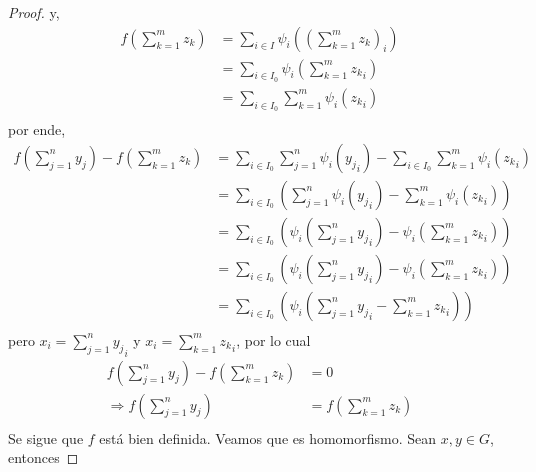 \documentclass[12pt]{report}
\newcounter{it}
\theoremstyle{largebreak}
\begin{document}
\begin{proof}
        y,
        \begin{equation*}
            \begin{split}
                f\left(\sum_{ k=1}^m z_k \right)&=\sum_{ i\in I}\psi_i\left(\left(\sum_{ k=1}^m z_k\right)_i\right)\\
                &=\sum_{ i\in I_0}\psi_i\left(\sum_{ k=1}^m {z_k}_i\right)\\
                &=\sum_{ i\in I_0}\sum_{ k=1}^m \psi_{ i}\left( {z_k}_{i}\right)\\
            \end{split}
        \end{equation*}
        por ende,
        \begin{equation*}
            \begin{split}
                f\left(\sum_{ j=1}^n y_j \right)-f\left(\sum_{ k=1}^m z_k \right)&=\sum_{ i\in I_0}\sum_{ j=1}^n \psi_{ i}\left( {y_j}_{i}\right)-\sum_{ i\in I_0}\sum_{ k=1}^m \psi_{ i}\left( {z_k}_{i}\right)\\
                &=\sum_{ i\in I_0}\left(\sum_{ j=1}^n \psi_{ i}\left( {y_j}_{i}\right)-\sum_{ k=1}^m \psi_{ i}\left( {z_k}_{i}\right)\right)\\
                &=\sum_{ i\in I_0}\left(\psi_{ i}\left(\sum_{ j=1}^n {y_j}_{i}\right)-\psi_{ i}\left(\sum_{ k=1}^m{z_k}_{i}\right)\right)\\
                &=\sum_{ i\in I_0}\left(\psi_{ i}\left(\sum_{ j=1}^n {y_j}_{i}\right)-\psi_{ i}\left(\sum_{ k=1}^m{z_k}_{i}\right)\right)\\
                &=\sum_{ i\in I_0}\left(\psi_{ i}\left(\sum_{ j=1}^n {y_j}_{i}-\sum_{ k=1}^m{z_k}_{i}\right)\right)\\
            \end{split}
        \end{equation*}
        pero $x_i=\sum_ { j=1}^n {y_j}_i$ y $x_i=\sum_ { k=1}^m {z_k}_i$, por lo cual
        \begin{equation*}
            \begin{split}
                f\left(\sum_{ j=1}^n y_j \right)-f\left(\sum_{ k=1}^m z_k \right)&=0\\
                \Rightarrow f\left(\sum_{ j=1}^n y_j \right)&=f\left(\sum_{ k=1}^m z_k \right)\\
            \end{split}
        \end{equation*}
        Se sigue que $f$ está bien definida. Veamos que es homomorfismo. Sean $x,y\in G$, entonces

\end{proof}
\end{document}
